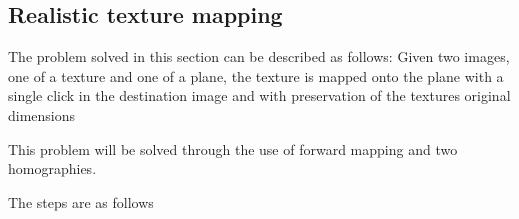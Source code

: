 \subsection{Realistic texture mapping}

The problem solved in this section can be described as follows:
\newline
Given two images, one of a texture and one of a plane, the texture is
mapped onto the plane with a single click in the destination image and with
preservation of the textures original dimensions

This problem will be solved through the use of forward mapping and two
homographies.

The steps are as follows

